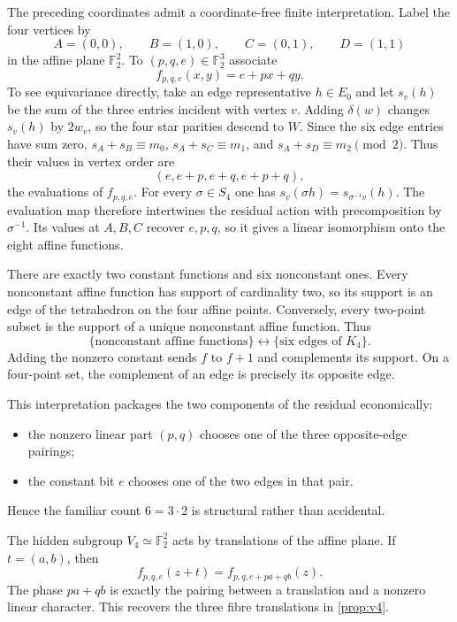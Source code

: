 \documentclass[11pt]{amsart}
\theoremstyle{definition}
\theoremstyle{remark}
\newcommand{\F}{\mathbb F}
\begin{document}
The preceding coordinates admit a coordinate-free finite interpretation. Label the four vertices by
\[
A=(0,0),\qquad B=(1,0),\qquad C=(0,1),\qquad D=(1,1)
\]
in the affine plane $\F_2^2$. To $(p,q,e)\in\F_2^3$ associate
\begin{equation}\label{eq:affinefunction}
f_{p,q,e}(x,y)=e+px+qy.
\end{equation}
To see equivariance directly, take an edge representative $h\in E_0$ and let $s_v(h)$ be the sum of the three entries incident with vertex $v$. Adding $\delta(w)$ changes $s_v(h)$ by $2w_v$, so the four star parities descend to $W$. Since the six edge entries have sum zero, $s_A+s_B\equiv m_0$, $s_A+s_C\equiv m_1$, and $s_A+s_D\equiv m_2\pmod 2$. Thus their values in vertex order are
\[
(e,e+p,e+q,e+p+q),
\]
the evaluations of $f_{p,q,e}$. For every $\sigma\in S_4$ one has $s_v(\sigma h)=s_{\sigma^{-1}v}(h)$. The evaluation map therefore intertwines the residual action with precomposition by $\sigma^{-1}$. Its values at $A,B,C$ recover $e,p,q$, so it gives a linear isomorphism onto the eight affine functions.

There are exactly two constant functions and six nonconstant ones. Every nonconstant affine function has support of cardinality two, so its support is an edge of the tetrahedron on the four affine points. Conversely, every two-point subset is the support of a unique nonconstant affine function. Thus
\[
\{\text{nonconstant affine functions}\}
\longleftrightarrow
\{\text{six edges of }K_4\}.
\]
Adding the nonzero constant sends $f$ to $f+1$ and complements its support. On a four-point set, the complement of an edge is precisely its opposite edge.

This interpretation packages the two components of the residual economically:
\begin{itemize}[leftmargin=2em]
\item the nonzero linear part $(p,q)$ chooses one of the three opposite-edge pairings;
\item the constant bit $e$ chooses one of the two edges in that pair.
\end{itemize}
Hence the familiar count $6=3\cdot2$ is structural rather than accidental.

The hidden subgroup $V_4\simeq\F_2^2$ acts by translations of the affine plane. If $t=(a,b)$, then
\[
f_{p,q,e}(z+t)=f_{p,q,e+pa+qb}(z).
\]
The phase $pa+qb$ is exactly the pairing between a translation and a nonzero linear character. This recovers the three fibre translations in \cref{prop:v4}.
\end{document}
